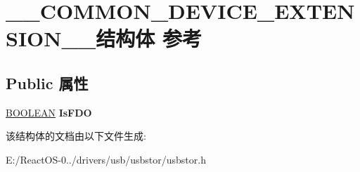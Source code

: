 \hypertarget{struct_____c_o_m_m_o_n___d_e_v_i_c_e___e_x_t_e_n_s_i_o_n____}{}\section{\+\_\+\+\_\+\+C\+O\+M\+M\+O\+N\+\_\+\+D\+E\+V\+I\+C\+E\+\_\+\+E\+X\+T\+E\+N\+S\+I\+O\+N\+\_\+\+\_\+结构体 参考}
\label{struct_____c_o_m_m_o_n___d_e_v_i_c_e___e_x_t_e_n_s_i_o_n____}
\subsection*{Public 属性}
\begin{DoxyCompactItemize}
\item 
\mbox{\label{struct_____c_o_m_m_o_n___d_e_v_i_c_e___e_x_t_e_n_s_i_o_n_____a869335220882d380d0b0e151fdcc523f}} 
\hyperlink{_processor_bind_8h_a112e3146cb38b6ee95e64d85842e380a}{B\+O\+O\+L\+E\+AN} {\bfseries Is\+F\+DO}
\end{DoxyCompactItemize}


该结构体的文档由以下文件生成\+:\begin{DoxyCompactItemize}
\item 
E\+:/\+React\+O\+S-\/0../drivers/usb/usbstor/usbstor.\+h\end{DoxyCompactItemize}
